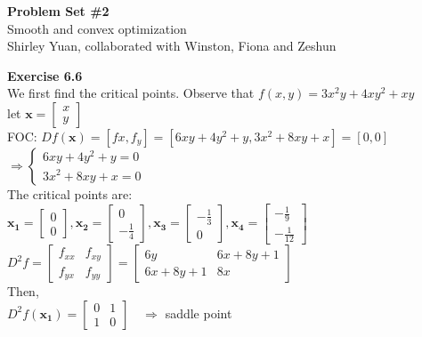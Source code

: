\documentclass[letterpaper,12pt]{article}
\theoremstyle{definition}
\renewcommand{\vec}[1]{\mathbf{#1}}
\begin{document}
\begin{flushleft}
  \textbf{\large{Problem Set \#2}} \\
  Smooth and convex optimization \\
    Shirley Yuan, collaborated with Winston, Fiona and Zeshun
\end{flushleft}

\noindent\textbf{Exercise 6.6}\\
We first find the critical points. Observe that
$f(x,y)=3x^2y+4xy^2+xy$\\
let $\vec{x}=\begin{bmatrix}
x\\y
\end{bmatrix}$\\
FOC: $Df(\vec{x})=[fx,f_y]=[6xy+4y^2+y, 3x^2+8xy+x]=[0,0]$\\
$\Rightarrow \begin{cases}
6xy+4y^2+y=0\\
3x^2+8xy+x=0
\end{cases}$\\
The critical points are:\\
$\vec{x_1}=\begin{bmatrix}
0\\0
\end{bmatrix}, \vec{x_2}=\begin{bmatrix}
0\\-\frac{1}{4}
\end{bmatrix}, \vec{x_3}=\begin{bmatrix}
-\frac{1}{3}\\0
\end{bmatrix},\vec{x_4}=\begin{bmatrix}
-\frac{1}{9}\\-\frac{1}{12}
\end{bmatrix}$\\
$D^2f=\begin{bmatrix}
f_{xx}&f_{xy}\\f_{yx}&f_{yy}
\end{bmatrix}=\begin{bmatrix}
6y&6x+8y+1\\6x+8y+1&8x
\end{bmatrix}$\\
Then, \\
$D^2f(\vec{x_1})=\begin{bmatrix}
0&1\\1&0
\end{bmatrix} \quad \Rightarrow$  saddle point\\
\end{document}
